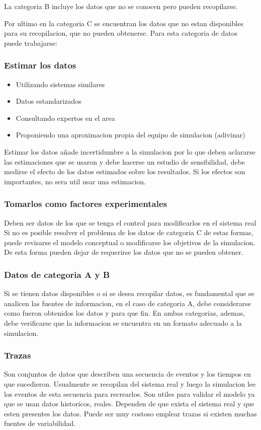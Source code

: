 \documentclass[a4paper]{article}
\begin{document}
La categoria B incluye los datos que no se conocen pero pueden recopilarse.

Por ultimo en la categoria C se encuentran los datos que no estan disponibles 
para su recopilacion, que no pueden obtenerse.
Para esta categoria de datos puede trabajarse:
\subsubsection*{Estimar los datos}
\begin{itemize}
    \item Utilizando sistemas similares
    \item Datos estandarizados
    \item Consultando expertos en el area 
    \item Proponiendo una aproximacion propia del equipo de simulacion (adivinar)
\end{itemize}
Estimar los datos añade incertidumbre a la simulacion por lo que deben aclararse
las estimaciones que se usaron y debe hacerse un estudio de sensibilidad, debe 
medirse el efecto de los datos estimados sobre los resultados. Si los efectos son
importantes, no sera util usar una estimacion.

\subsubsection*{Tomarlos como factores experimentales}
Deben ser datos de los que se tenga el control para modificarlos en el
sistema real
Si no es posible resolver el problema de los datos de categoria C de estas formas,
puede revisarse el modelo conceptual o modificarse los objetivos de la simulacion.
De esta forma pueden dejar de requerirse los datos que no se pueden obtener.

\subsubsection*{Datos de categoria A y B}
Si se tienen datos disponibles o si se desea recopilar datos, es fundamental que
se analicen las fuentes de informacion, en el caso de categoria A, debe considerarse
como fueron obtenidos los datos y para que fin. En ambas categorias, ademas, debe
verificarse que la informacion se encuentra en un formato adecuado a la simulacion.

\subsubsection*{Trazas}
Son conjuntos de datos que describen una secuencia de eventos y los tiempos en que 
sucedieron. Usualmente se recopilan del sistema real y luego la simulacion lee 
los eventos de esta secuencia para recrearlos. Son utiles para validar el modelo 
ya que se usan datos historicos, reales.
Dependen de que exista el sistema real y que esten presentes los datos. Puede ser muy
costoso emplear trazas si existen muchas fuentes de variabilidad.
\end{document}
